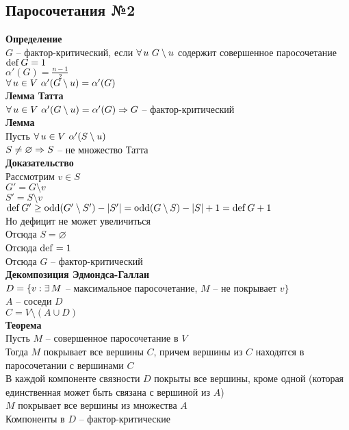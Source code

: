 \documentclass[12pt]{article}
\begin{document}
\subsection{Паросочетания №2}
\textbf{Определение}\\
$G$ -- фактор-критический, если $\fall u\ G\setminus u$ содержит совершенное паросочетание\\
$\operatorname{def} G = 1$\\
$\alpha'(G) = \frac{n-1}{2}$\\
$\forall\, u \in V\ \alpha'(G\setminus u) = \alpha'(G)$\\
\textbf{Лемма Татта}\\
$\forall\, u \in V\ \alpha'(G\setminus u) = \alpha'(G) \Rightarrow G$ -- фактор-критический\\
\textbf{Лемма}\\
Пусть $\forall\, u \in V\ \alpha'(S\setminus u)$\\
$S \neq \varnothing \Rightarrow S$ -- не множество Татта\\
\textbf{Доказательство}\\
Рассмотрим $v\in S$\\
$G'=G\setminus v$\\
$S'=S\setminus v$\\
$\operatorname{def} G' \geq \operatorname{odd}(G'\setminus S') - |S'| = \operatorname{odd}(G\setminus S) - |S| + 1 = \operatorname{def} G + 1$\\
Но дефицит не может увеличиться\\
Отсюда $S = \varnothing$\\
Отсюда $\operatorname{def} = 1$\\
Отсюда $G$ -- фактор-критический\\
\textbf{Декомпозиция Эдмондса-Галлаи}\\
$D = \{v: \exists\, M$ -- максимальное паросочетание, $M$ -- не покрывает $v\}$\\
$A$ -- соседи $D$\\
$C = V\setminus(A\cup D)$\\
\textbf{Теорема}\\
Пусть $M$ -- совершенное паросочетание в $V$\\
Тогда $M$ покрывает все вершины $C$, причем вершины из $C$ находятся в паросочетании с вершинами $C$\\
В каждой компоненте связности $D$ покрыты все вершины, кроме одной (которая единственная может быть связана с вершиной из $A$)\\
$M$ покрывает все вершины из множества $A$\\
Компоненты в $D$ -- фактор-критические\\
\end{document}
